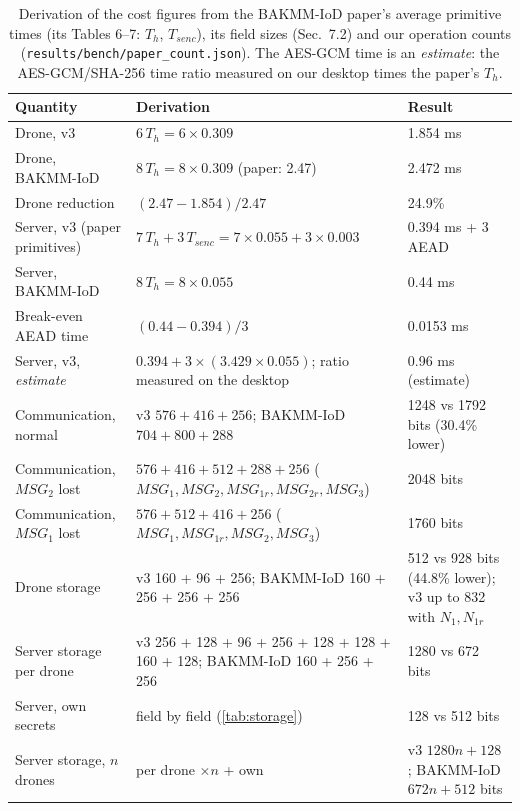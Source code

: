 \begin{table}[!t]
\centering
\footnotesize
\caption{Derivation of the cost figures from the BAKMM-IoD paper's average primitive times (its Tables 6--7: $T_h$, $T_{senc}$), its field sizes (Sec.~7.2) and our operation counts (\texttt{results/bench/paper\_count.json}). The AES-GCM time is an \emph{estimate}: the AES-GCM/SHA-256 time ratio measured on our desktop times the paper's $T_h$.}
\label{tab:derivation}
\setlength{\tabcolsep}{3pt}
\begin{tabular}{p{3.4cm}p{8.0cm}p{4.2cm}}
\toprule
Quantity & Derivation & Result \\
\midrule
Drone, v3 & $6\,T_h = 6 \times 0.309$ & 1.854 ms \\
Drone, BAKMM-IoD & $8\,T_h = 8 \times 0.309$ (paper: 2.47) & 2.472 ms \\
Drone reduction & $(2.47 - 1.854)/2.47$ & 24.9\% \\
Server, v3 (paper primitives) & $7\,T_h + 3\,T_{senc} = 7 \times 0.055 + 3 \times 0.003$ & 0.394 ms + 3 AEAD \\
Server, BAKMM-IoD & $8\,T_h = 8 \times 0.055$ & 0.44 ms \\
Break-even AEAD time & $(0.44 - 0.394)/3$ & 0.0153 ms \\
Server, v3, \emph{estimate} & $0.394 + 3 \times (3.429 \times 0.055)$; ratio measured on the desktop & 0.96 ms (estimate) \\
Communication, normal & v3 $576 + 416 + 256$; BAKMM-IoD $704 + 800 + 288$ & 1248 vs 1792 bits (30.4\% lower) \\
Communication, $MSG_2$ lost & $576 + 416 + 512 + 288 + 256$ ($MSG_1, MSG_2, MSG_{1r}, MSG_{2r}, MSG_3$) & 2048 bits \\
Communication, $MSG_1$ lost & $576 + 512 + 416 + 256$ ($MSG_1, MSG_{1r}, MSG_2, MSG_3$) & 1760 bits \\
Drone storage & v3 160 + 96 + 256; BAKMM-IoD 160 + 256 + 256 + 256 & 512 vs 928 bits (44.8\% lower); v3 up to 832 with $N_1, N_{1r}$ \\
Server storage per drone & v3 256 + 128 + 96 + 256 + 128 + 128 + 160 + 128; BAKMM-IoD 160 + 256 + 256 & 1280 vs 672 bits \\
Server, own secrets & field by field (\cref{tab:storage}) & 128 vs 512 bits \\
Server storage, $n$ drones & per drone $\times n$ + own & v3 $1280n + 128$; BAKMM-IoD $672n + 512$ bits \\
\bottomrule
\end{tabular}
\end{table}

